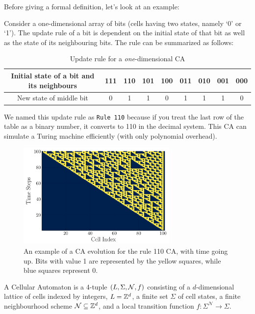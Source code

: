 \documentclass[11pt, oneside, listof=totoc]{scrbook}
\begin{document}
Before giving a formal definition, let's look at an example:
\begin{example}
    \label{eg:rule110}
    Consider a one-dimensional array of bits (\ie cells having two states, namely `0' or `1'). The update rule of a bit is dependent on the initial state of that bit as well as the state of its neighbouring bits. The rule can be summarized as follows:
    \begin{table}[H]
        \centering
        \begin{tabular}{ | c | c | c | c | c | c | c | c | c | }
            \hline
            Initial state of a bit and its neighbours & 111 & 110 & 101 & 100 & 011 & 010 & 001 & 000 \\
            \hline
            New state of middle bit                   & 0   & 1   & 1   & 0   & 1   & 1   & 1   & 0   \\
            \hline
        \end{tabular}
        \caption{Update rule for a \textit{one}-dimensional CA}
        \label{tab:rule110}
    \end{table}
    We named this update rule as \verb|Rule 110| because if you treat the last row of the table as a binary number, it converts to 110 in the decimal system. This CA can simulate a Turing machine efficiently (with only polynomial overhead).
    \begin{figure}[H]
        \centering
        \includegraphics[width = 0.7\textwidth]{rule110_cellular_automaton.png}
        \caption{An example of a CA evolution for the rule 110 CA, with time going up. Bits with value 1 are
            represented by the yellow squares, while blue squares represent 0.}
        \label{fig:rule110}
    \end{figure} \noindent

\end{example}

\begin{definition}
    A Cellular Automaton is a 4-tuple \(\qty(L, \Sigma, \mathcal{N}, f)\) consisting of a $d$-dimensional lattice of cells indexed by integers, $L = \mathbb Z^d$, a finite set $\Sigma$ of cell states, a finite neighbourhood scheme $\mathcal{N} \subseteq \mathbb Z^d$, and a local transition function $f: \Sigma^{\mathcal{N}} \to \Sigma$.
\end{definition}
\end{document}

